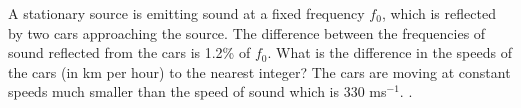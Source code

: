 
\item A stationary source is emitting sound at a fixed frequency \( f_0 \), which is reflected by two cars approaching the source. The difference between the frequencies of sound reflected from the cars is 1.2\% of \( f_0 \). What is the difference in the speeds of the cars (in km per hour) to the nearest integer? The cars are moving at constant speeds much smaller than the speed of sound which is 330 ms\(^{-1}\). \underline{\hspace{2.5cm}}.
